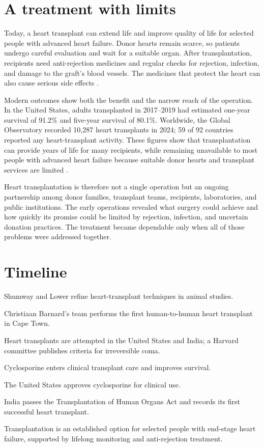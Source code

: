 \documentclass[12pt,oneside]{book}
\begin{document}
\section{A treatment with limits}
Today, a heart transplant can extend life and improve quality of life for
selected people with advanced heart failure. Donor hearts remain scarce, so
patients undergo careful evaluation and wait for a suitable organ. After
transplantation, recipients need anti-rejection medicines and regular checks
for rejection, infection, and damage to the graft's blood vessels. The
medicines that protect the heart can also cause serious side effects
\cite{nhlbiHeartTransplant}.

Modern outcomes show both the benefit and the narrow reach of the operation.
In the United States, adults transplanted in 2017--2019 had estimated
one-year survival of 91.2\% and five-year survival of 80.1\%. Worldwide,
the Global Observatory recorded 10,287 heart transplants in 2024; 59 of 92
countries reported any heart-transplant activity.
These figures show that transplantation can provide years of life for many
recipients, while remaining unavailable to most people with advanced heart
failure because suitable donor hearts and transplant services are limited
\cite{srtrHeart2024,godtGlobal2024}.

Heart transplantation is therefore not a single operation but an ongoing
partnership among donor families, transplant teams, recipients, laboratories,
and public institutions. The early operations revealed what surgery could
achieve and how quickly its promise could be limited by rejection, infection,
and uncertain donation practices. The treatment became dependable only when
all of those problems were addressed together.

\section*{Timeline}
\begin{description}[leftmargin=2.3cm,style=nextline]
  \item[1959--1960] Shumway and Lower refine heart-transplant techniques in animal studies.
  \item[3 December 1967] Christiaan Barnard's team performs the first human-to-human heart transplant in Cape Town.
  \item[1968] Heart transplants are attempted in the United States and India; a Harvard committee publishes criteria for irreversible coma.
  \item[Late 1970s--1980] Cyclosporine enters clinical transplant care and improves survival.
  \item[1983] The United States approves cyclosporine for clinical use.
  \item[1994] India passes the Transplantation of Human Organs Act and records its first successful heart transplant.
  \item[Today] Transplantation is an established option for selected people with end-stage heart failure, supported by lifelong monitoring and anti-rejection treatment.
\end{description}
\end{document}
